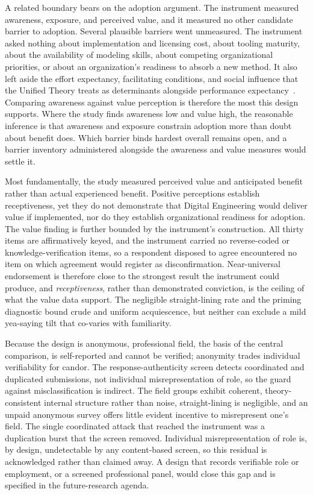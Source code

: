 A related boundary bears on the adoption argument. The instrument measured awareness, exposure, and perceived value, and it measured no other candidate barrier to adoption. Several plausible barriers went unmeasured. The instrument asked nothing about implementation and licensing cost, about tooling maturity, about the availability of modeling skills, about competing organizational priorities, or about an organization's readiness to absorb a new method. It also left aside the effort expectancy, facilitating conditions, and social influence that the Unified Theory treats as determinants alongside performance expectancy~\parencite{Venkatesh_2003}. Comparing awareness against value perception is therefore the most this design supports. Where the study finds awareness low and value high, the reasonable inference is that awareness and exposure constrain adoption more than doubt about benefit does. Which barrier binds hardest overall remains open, and a barrier inventory administered alongside the awareness and value measures would settle it.

Most fundamentally, the study measured perceived value and anticipated benefit rather than actual experienced benefit. Positive perceptions establish receptiveness, yet they do not demonstrate that Digital Engineering would deliver value if implemented, nor do they establish organizational readiness for adoption. The value finding is further bounded by the instrument's construction. All thirty items are affirmatively keyed, and the instrument carried no reverse-coded or knowledge-verification items, so a respondent disposed to agree encountered no item on which agreement would register as disconfirmation. Near-universal endorsement is therefore close to the strongest result the instrument could produce, and \emph{receptiveness}, rather than demonstrated conviction, is the ceiling of what the value data support. The negligible straight-lining rate and the priming diagnostic bound crude and uniform acquiescence, but neither can exclude a mild yea-saying tilt that co-varies with familiarity.

Because the design is anonymous, professional field, the basis of the central comparison, is self-reported and cannot be verified; anonymity trades individual verifiability for candor. The response-authenticity screen detects coordinated and duplicated submissions, not individual misrepresentation of role, so the guard against misclassification is indirect. The field groups exhibit coherent, theory-consistent internal structure rather than noise, straight-lining is negligible, and an unpaid anonymous survey offers little evident incentive to misrepresent one's field. The single coordinated attack that reached the instrument was a duplication burst that the screen removed. Individual misrepresentation of role is, by design, undetectable by any content-based screen, so this residual is acknowledged rather than claimed away. A design that records verifiable role or employment, or a screened professional panel, would close this gap and is specified in the future-research agenda.

